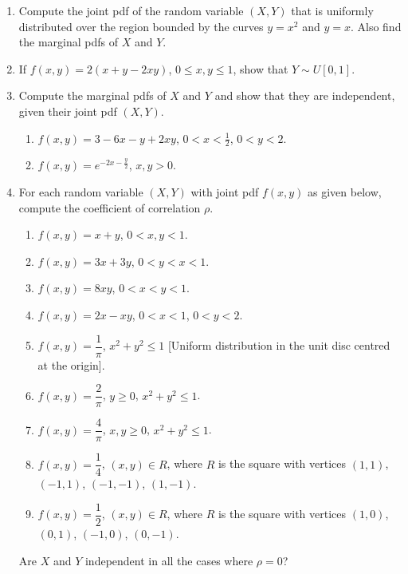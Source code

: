 \documentclass[svgnames]{amsart}
\begin{document}
\begin{enumerate}[leftmargin=*]
\item Compute the joint pdf of the random variable $(X, Y)$ that is uniformly distributed over the region bounded by the curves $y = x^2$ and $y = x$. Also find the marginal pdfs of $X$ and $Y$.

\item If $f(x, y) = 2(x + y - 2xy)$, $0 \le x, y \le 1$, show that $Y \sim U[0, 1]$.

\item Compute the marginal pdfs of $X$ and $Y$ and show that they are independent, given their joint pdf $(X, Y)$.
\begin{enumerate}
	\item $f(x, y) = 3 - 6x - y + 2xy$, $0 < x < \frac 1 2$, $0 < y < 2$.
	\item $f(x, y) = e^{-2x - \frac y 2}$, $x, y > 0$.
\end{enumerate}

\item For each random variable $(X, Y)$ with joint pdf $f(x, y)$ as given below, compute the coefficient of correlation $\rho$.
\begin{enumerate}
	\item $f(x, y) = x + y$, $0 < x, y < 1$.
	\item $f(x, y) = 3x + 3y$, $0 < y < x < 1$.
    \item $f(x, y) = 8xy$, $0 < x < y < 1$.
	\item $f(x, y) = 2x - xy$, $0 < x < 1$, $0 < y < 2$.
	\item $f(x, y) = \dfrac 1 \pi$, $x^2 + y^2 \le 1$ [Uniform distribution in the unit disc centred at the origin].
	\item $f(x, y) = \dfrac 2 \pi$, $y \ge 0$, $x^2 + y^2 \le 1$.
	\item $f(x, y) = \dfrac 4 \pi$, $x,y \ge 0$, $x^2 + y^2 \le 1$.
	\item $f(x, y) = \dfrac 1 4$, $(x, y) \in R$, where $R$ is the square with vertices $(1, 1)$, $(-1, 1)$, $(-1, -1)$, $(1, -1)$.
	\item $f(x, y) = \dfrac 1 2$, $(x, y) \in R$, where $R$ is the square with vertices $(1, 0)$, $(0, 1)$, $(-1, 0)$, $(0, -1)$.
\end{enumerate}
Are $X$ and $Y$ independent in all the cases where $\rho = 0$?
\end{enumerate}
\end{document}

